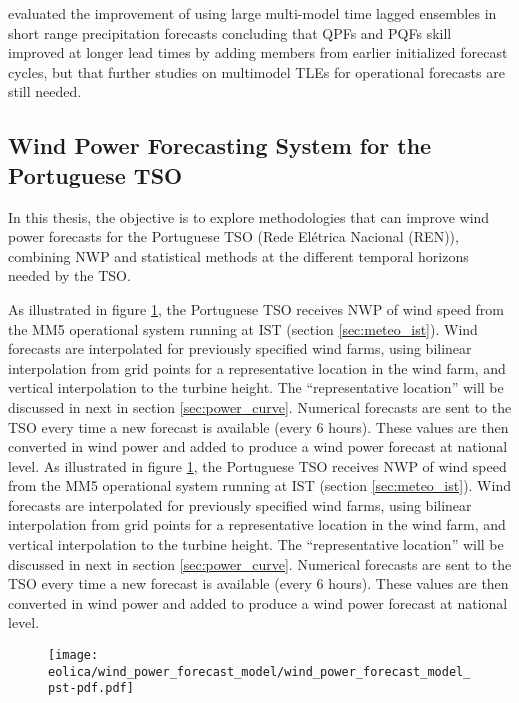 \cite{Yuan2009} evaluated the improvement of using large multi-model time lagged ensembles in short range precipitation forecasts concluding that QPFs and PQFs skill improved at longer lead times by adding members from earlier initialized forecast cycles, but that further studies on multimodel TLEs for operational forecasts are still needed.


\subsection{Wind Power Forecasting System for the Portuguese TSO}

In this thesis, the objective is to explore methodologies that can improve wind power forecasts for the Portuguese TSO (Rede Elétrica Nacional (REN)), combining NWP and statistical methods at the different temporal horizons needed by the TSO. 

As illustrated in figure \ref{fig:wp_model}, the Portuguese TSO receives NWP of wind speed from the MM5 operational system running at IST (section \ref{sec:meteo_ist}). Wind forecasts are interpolated for previously specified wind farms, using bilinear interpolation from grid points for a representative location in the wind farm, and vertical interpolation to the turbine height. The ``representative location'' will be discussed in next in section \ref{sec:power_curve}. Numerical forecasts are sent to the TSO every time a new forecast is available (every 6 hours). These values are then converted in wind power and added to produce a wind power forecast at national level. 
As illustrated in figure \ref{fig:wp_model}, the Portuguese TSO receives NWP of wind speed from the MM5 operational system running at IST (section \ref{sec:meteo_ist}). Wind forecasts are interpolated for previously specified wind farms, using bilinear interpolation from grid points for a representative location in the wind farm, and vertical interpolation to the turbine height. The ``representative location'' will be discussed in next in section \ref{sec:power_curve}. Numerical forecasts are sent to the TSO every time a new forecast is available (every 6 hours). These values are then converted in wind power and added to produce a wind power forecast at national level. 

\begin{figure}[!htp]
    \centering
     \texttt{[image: eolica/wind\_power\_forecast\_model/wind\_power\_forecast\_model\_pst-pdf.pdf]}
    \label{fig:wp_model}
\end{figure}
\FloatBarrier

